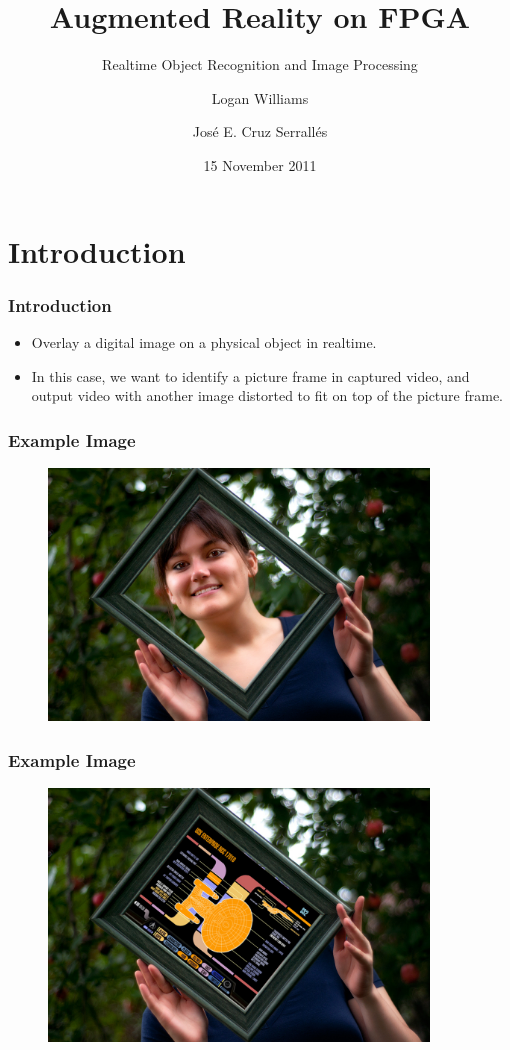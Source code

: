\documentclass{beamer}
\title[Augmented Reality on FPGA]{Augmented Reality on FPGA}
\subtitle{Realtime Object Recognition and Image Processing}
\author{Logan Williams \and Jos\'{e} E. Cruz Serrall\'{e}s}
\date{15 November 2011}
\begin{document}
\begin{frame}
	\titlepage
\end{frame}

\section{Introduction}
\begin{frame}
	\frametitle{Introduction}
	\begin{itemize}
		\item Overlay a digital image on a physical object in realtime.
		\item In this case, we want to identify a picture frame in captured video, and output video with another image distorted to fit on top of the picture frame.
	\end{itemize}
\end{frame}

\begin{frame}
	\frametitle{Example Image}
	\begin{figure}
		\centering
		\includegraphics[width=0.9\textwidth]{images/example/example1.png}
	\end{figure}
\end{frame}

\begin{frame}
	\frametitle{Example Image}
	\begin{figure}
		\centering
		\includegraphics[width=0.9\textwidth]{images/example/example2.jpg}
	\end{figure}
\end{frame}
\end{document}
